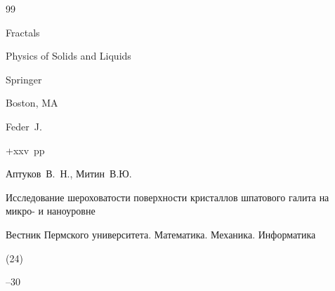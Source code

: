 \begin{thebibliography}{99}






	


\book  Fractals


\serial Physics of Solids and Liquids

\publ Springer

\publaddr Boston, MA

\by Feder~J.

+xxv~pp \nofrills







\by Аптуков~В.~Н., Митин~В.Ю.

\paper Исследование шероховатости поверхности кристаллов шпатового галита на микро- и наноуровне 

\jour Вестник Пермского университета. Математика. Механика. Информатика


(24)

--30


















\end{thebibliography}
